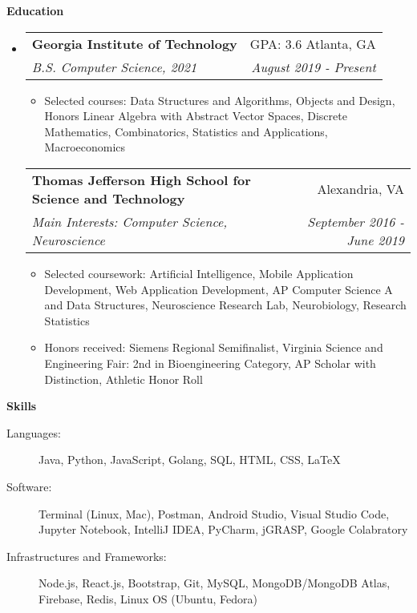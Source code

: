 \documentclass[letterpaper,11pt]{article}
\makeatletter
\newcommand{\resitem}[1]{\item #1 \vspace{-2pt}}
\newcommand{\resheading}[1]{{\large \colorbox{mygrey}{\begin{minipage}{\textwidth}{\textbf{#1 \vphantom{p\^{E}}}}\end{minipage}}}}
\newcommand{\ressubheading}[4]{
\begin{tabular*}{7.0in}{l@{\extracolsep{\fill}}r}
		\textbf{#1} & #2 \\
		\textit{#3} & \textit{#4} \\
\end{tabular*}\vspace{-6pt}}
\makeatother
\begin{document}
\resheading{Education}
\begin{itemize}
\item[]  %
    \ressubheading{Georgia Institute of Technology}{GPA: 3.6 \hspace{1em} Atlanta, GA}{B.S. Computer Science, 2021}{August 2019 - Present}
	\begin{itemize}
	    \resitem{Selected courses: Data Structures and Algorithms, Objects and Design, Honors Linear Algebra with Abstract Vector Spaces, Discrete Mathematics, Combinatorics, Statistics and Applications, Macroeconomics}
	\end{itemize}
	\ressubheading{Thomas Jefferson High School for Science and Technology}{Alexandria, VA}{Main Interests: Computer Science, Neuroscience}{September 2016 - June 2019}
	\begin{itemize}
        \resitem{Selected coursework: Artificial Intelligence, Mobile Application Development, Web Application Development, AP Computer Science A and Data Structures, Neuroscience Research Lab, Neurobiology, Research Statistics}
        \resitem{Honors received: Siemens Regional Semifinalist, Virginia Science and Engineering Fair: 2nd in Bioengineering Category, AP Scholar with Distinction, Athletic Honor Roll}
	\end{itemize}
\end{itemize}

\resheading{Skills}

\begin{description}
\item[Languages:] Java, Python, JavaScript, Golang, SQL, HTML, CSS, LaTeX %
\item[Software:] Terminal (Linux, Mac), Postman, Android Studio, Visual Studio Code, Jupyter Notebook, IntelliJ IDEA, PyCharm, jGRASP, Google Colabratory
\item[Infrastructures and Frameworks:] Node.js, React.js, Bootstrap, Git, MySQL, MongoDB/MongoDB Atlas, Firebase, Redis, Linux OS (Ubuntu, Fedora)
\end{description}
\end{document}
